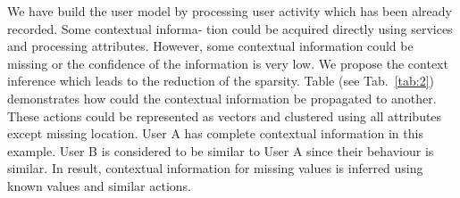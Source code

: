 \documentclass{acm_proc_article-sp} %
\begin{document}
We have build the user model by processing user activity
which has been already recorded. Some contextual informa-
tion could be acquired directly using services and processing
attributes. However, some contextual information could be
missing or the confidence of the information is very low. We
propose the context inference which leads to the reduction
of the sparsity. Table (see Tab.~\ref{tab:2}) demonstrates how could
the contextual information be propagated to another. These
actions could be represented as vectors and clustered using
all attributes except missing location. User A has complete
contextual information in this example. User B is considered
to be similar to User A since their behaviour is similar. In
result, contextual information for missing values is inferred
using known values and similar actions.
\end{document}
